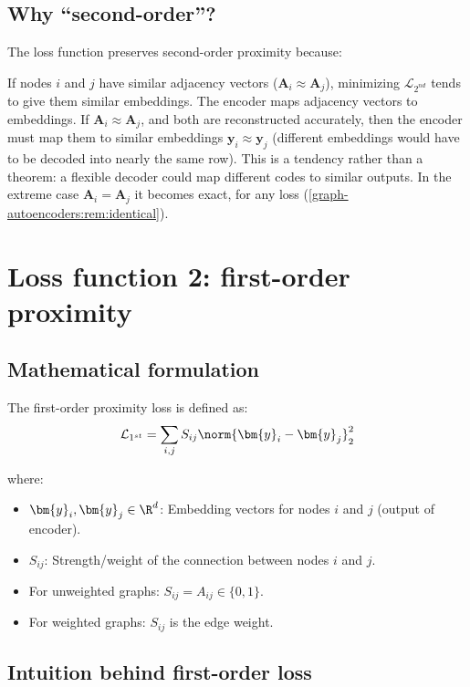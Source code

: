 \begin{notechapter}
\subsection{Why ``second-order''?}

The loss function preserves second-order proximity because:

\begin{intuition}
If nodes $i$ and $j$ have similar adjacency vectors ($\bm{A}_i \approx \bm{A}_j$), minimizing $\mathcal{L}_{2^{nd}}$ tends to give them similar embeddings.
The encoder maps adjacency vectors to embeddings. If $\bm{A}_i \approx \bm{A}_j$, and both are reconstructed accurately, then the encoder must map them to similar embeddings $\bm{y}_i \approx \bm{y}_j$ (different embeddings would have to be decoded into nearly the same row). This is a tendency rather than a theorem: a flexible decoder could map different codes to similar outputs. In the extreme case $\bm A_i = \bm A_j$ it becomes exact, for any loss (\cref{graph-autoencoders:rem:identical}).
\end{intuition}

\section{Loss function 2: first-order proximity}

\subsection{Mathematical formulation}

The first-order proximity loss is defined as:
\begin{equation}
\mathcal{L}_{1^{st}} = \sum_{i,j} S_{ij} \norm{\bm{y}_i - \bm{y}_j}^2_2
\label{graph-autoencoders:eq:l1_loss}
\end{equation}

where:
\begin{itemize}
    \item $\bm{y}_i, \bm{y}_j \in \R^d$: Embedding vectors for nodes $i$ and $j$ (output of encoder).
    \item $S_{ij}$: Strength/weight of the connection between nodes $i$ and $j$.
    \item For unweighted graphs: $S_{ij} = A_{ij} \in \{0, 1\}$.
    \item For weighted graphs: $S_{ij}$ is the edge weight.
\end{itemize}

\subsection{Intuition behind first-order loss}


\end{notechapter}
